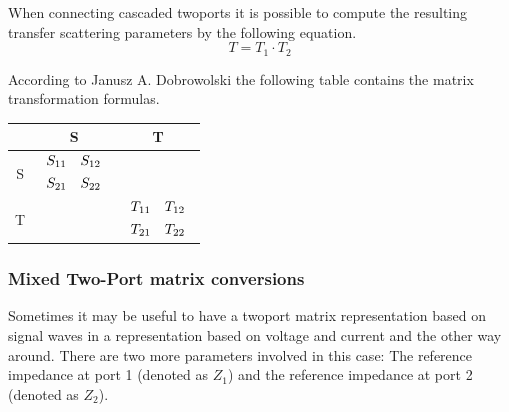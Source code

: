 \documentclass[10pt]{report}
\begin{document}
When connecting cascaded twoports it is possible to compute the
resulting transfer scattering parameters by the following equation.
\begin{equation}
T = T_1 \cdot T_2
\end{equation}

According to Janusz A. Dobrowolski \cite{Dobrowolski} the following
table contains the matrix transformation formulas.

\addvspace{12pt}

\begin{tabular}{|c|c|c|}
\hline
& S & T\\
\hline
S &
$\begin{array}{cc}S_{11}&S_{12}\vspace{4pt}\\S_{21}&S_{22}\end{array}$ &
\setlength{\fboxrule}{0pt}
\fbox{$\begin{array}{cc}\dfrac{T_{12}}{T_{22}}&\dfrac{\Delta T}{T_{22}}\vspace{4pt}\\\dfrac{1}{T_{22}}&\dfrac{-T_{21}}{T_{22}}\end{array}$}\\
\hline
T &
\setlength{\fboxrule}{0pt}
\fbox{$\begin{array}{cc}\dfrac{-\Delta S}{S_{21}}&\dfrac{S_{11}}{S_{21}}\vspace{4pt}\\\dfrac{-S_{22}}{S_{21}}&\dfrac{1}{S_{21}}\end{array}$} &
$\begin{array}{cc}T_{11}&T_{12}\vspace{4pt}\\T_{21}&T_{22}\end{array}$\\
\hline
\end{tabular}

\subsubsection{Mixed Two-Port matrix conversions}

Sometimes it may be useful to have a twoport matrix representation
based on signal waves in a representation based on voltage and current
and the other way around.  There are two more parameters involved in
this case: The reference impedance at port 1 (denoted as $Z_1$) and
the reference impedance at port 2 (denoted as $Z_2$).
\end{document}
